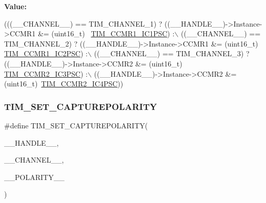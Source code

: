 {\bfseries Value\+:}
\begin{DoxyCode}
(((\_\_CHANNEL\_\_) == TIM\_CHANNEL\_1) ? ((\_\_HANDLE\_\_)->Instance->CCMR1 &= (uint16\_t)~
      \mbox{\hyperlink{group___peripheral___registers___bits___definition_gab46b7186665f5308cd2ca52acfb63e72}{TIM\_CCMR1\_IC1PSC}}) :\(\backslash\)
 ((\_\_CHANNEL\_\_) == TIM\_CHANNEL\_2) ? ((\_\_HANDLE\_\_)->Instance->CCMR1 &= (uint16\_t)~
      \mbox{\hyperlink{group___peripheral___registers___bits___definition_ga5e8e704f9ce5742f45e15e3b3126aa9d}{TIM\_CCMR1\_IC2PSC}}) :\(\backslash\)
 ((\_\_CHANNEL\_\_) == TIM\_CHANNEL\_3) ? ((\_\_HANDLE\_\_)->Instance->CCMR2 &= (uint16\_t)~
      \mbox{\hyperlink{group___peripheral___registers___bits___definition_gafc3d11f2e968752bc9ec7131c986c3a6}{TIM\_CCMR2\_IC3PSC}}) :\(\backslash\)
 ((\_\_HANDLE\_\_)->Instance->CCMR2 &= (uint16\_t)~\mbox{\hyperlink{group___peripheral___registers___bits___definition_ga6fd7591e2de10272f7fafb08cdd1b7b0}{TIM\_CCMR2\_IC4PSC}}))
\end{DoxyCode}
\mbox{\label{group___t_i_m___exported___macros_ga4321d7371ca3a8c18f96e925667a7b2f}} 
\subsubsection{\texorpdfstring{T\+I\+M\+\_\+\+S\+E\+T\+\_\+\+C\+A\+P\+T\+U\+R\+E\+P\+O\+L\+A\+R\+I\+TY}{TIM\_SET\_CAPTUREPOLARITY}}
{\footnotesize\ttfamily \#define T\+I\+M\+\_\+\+S\+E\+T\+\_\+\+C\+A\+P\+T\+U\+R\+E\+P\+O\+L\+A\+R\+I\+TY(\begin{DoxyParamCaption}\item[{}]{\+\_\+\+\_\+\+H\+A\+N\+D\+L\+E\+\_\+\+\_\+,  }\item[{}]{\+\_\+\+\_\+\+C\+H\+A\+N\+N\+E\+L\+\_\+\+\_\+,  }\item[{}]{\+\_\+\+\_\+\+P\+O\+L\+A\+R\+I\+T\+Y\+\_\+\+\_\+ }\end{DoxyParamCaption})}

